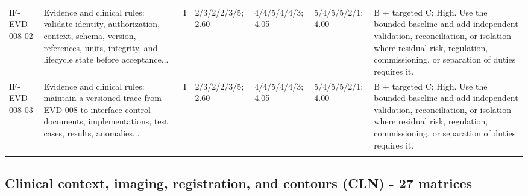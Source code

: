 \documentclass[11pt,letterpaper]{article}
\begin{document}
\begin{scriptsize}
\begin{longtable}{@{}L{0.11\textwidth}L{0.165\textwidth}L{0.04\textwidth}L{0.115\textwidth}L{0.115\textwidth}L{0.115\textwidth}L{0.235\textwidth}@{}}
\addlinespace[2pt]
IF-EVD-008-02 & Evidence and clinical rules: validate identity, authorization, context, schema, version, references, units, integrity, and lifecycle state before acceptance... & I & 2/3/2/2/3/5; 2.60 & 4/4/5/4/4/3; 4.05 & 5/4/5/5/2/1; 4.00 & B + targeted C; High. Use the bounded baseline and add independent validation, reconciliation, or isolation where residual risk, regulation, commissioning, or separation of duties requires it. \\
\addlinespace[2pt]
IF-EVD-008-03 & Evidence and clinical rules: maintain a versioned trace from EVD-008 to interface-control documents, implementations, test cases, results, anomalies... & I & 2/3/2/2/3/5; 2.60 & 4/4/5/4/4/3; 4.05 & 5/4/5/5/2/1; 4.00 & B + targeted C; High. Use the bounded baseline and add independent validation, reconciliation, or isolation where residual risk, regulation, commissioning, or separation of duties requires it. \\
\addlinespace[2pt]
\end{longtable}
\end{scriptsize}

\subsection{Clinical context, imaging, registration, and contours (CLN) - 27 matrices}
\end{document}
